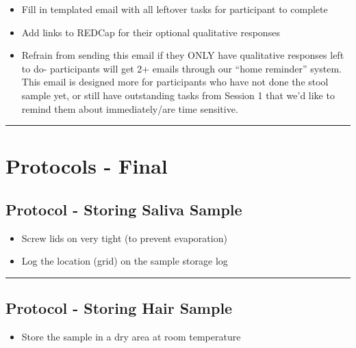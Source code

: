 \documentclass[]{book}
\providecommand{\tightlist}{%
  \setlength{\itemsep}{0pt}\setlength{\parskip}{0pt}}
\begin{document}
\begin{itemize}
\tightlist
\item
  Fill in templated email with all leftover tasks for participant to complete
\item
  Add links to REDCap for their optional qualitative responses
\item
  Refrain from sending this email if they ONLY have qualitative responses left to do- participants will get 2+ emails through our ``home reminder'' system. This email is designed more for participants who have not done the stool sample yet, or still have outstanding tasks from Session 1 that we'd like to remind them about immediately/are time sensitive.
\end{itemize}

\begin{center}\rule{0.5\linewidth}{0.5pt}\end{center}

\hypertarget{protocols---final}{%
\section{Protocols - Final}\label{protocols---final}}

\hypertarget{protocol---storing-saliva-sample}{%
\subsection{Protocol - Storing Saliva Sample}\label{protocol---storing-saliva-sample}}

\begin{itemize}
\tightlist
\item
  Screw lids on very tight (to prevent evaporation)
\item
  Log the location (grid) on the sample storage log
\end{itemize}

\begin{center}\rule{0.5\linewidth}{0.5pt}\end{center}

\hypertarget{protocol---storing-hair-sample}{%
\subsection{Protocol - Storing Hair Sample}\label{protocol---storing-hair-sample}}

\begin{itemize}
\tightlist
\item
  Store the sample in a dry area at room temperature
\end{itemize}
\end{document}
